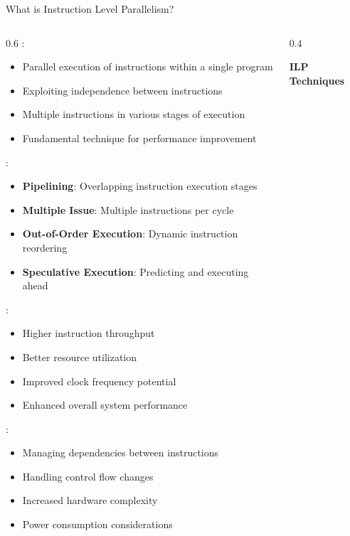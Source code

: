 \begin{frame}{What is Instruction Level Parallelism?}
\begin{columns}
\begin{column}{0.6\textwidth}
:
\begin{itemize}
\item Parallel execution of instructions within a single program
\item Exploiting independence between instructions
\item Multiple instructions in various stages of execution
\item Fundamental technique for performance improvement
\end{itemize}

\vspace{0.3cm}
:
\begin{itemize}
\item \textbf{Pipelining}: Overlapping instruction execution stages
\item \textbf{Multiple Issue}: Multiple instructions per cycle
\item \textbf{Out-of-Order Execution}: Dynamic instruction reordering
\item \textbf{Speculative Execution}: Predicting and executing ahead
\end{itemize}

\vspace{0.3cm}
:
\begin{itemize}
\item Higher instruction throughput
\item Better resource utilization
\item Improved clock frequency potential
\item Enhanced overall system performance
\end{itemize}

\vspace{0.3cm}
:
\begin{itemize}
\item Managing dependencies between instructions
\item Handling control flow changes
\item Increased hardware complexity
\item Power consumption considerations
\end{itemize}
\end{column}
\begin{column}{0.4\textwidth}
\begin{center}
\textbf{ILP Techniques}
\vspace{0.3cm}


\end{center}
\end{column}
\end{columns}
\end{frame}

